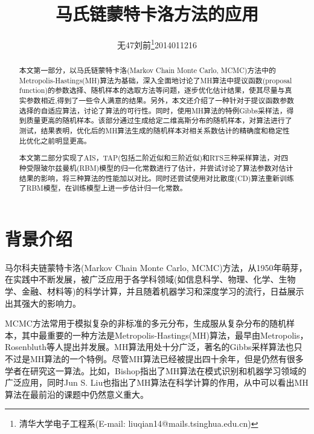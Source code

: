 \documentclass[11pt]{article}
\begin{document}
\title{马氏链蒙特卡洛方法的应用}
\author{无47\hspace{2em}刘前\thanks{清华大学电子工程系(E-mail: liuqian14@mails.tsinghua.edu.cn)}\hspace{2em}2014011216\hspace{2em}}

\maketitle


\begin{abstract}
  本文第一部分，以马氏链蒙特卡洛(Markov Chain Monte Carlo, MCMC)方法中的Metropolis-Hastings(MH)算法为基础，深入全面地讨论了MH算法中提议函数(proposal function)的参数选择、随机样本的选取方法等问题，逐步优化估计结果，使其尽量与真实参数相近,得到了一些令人满意的结果。另外，本文还介绍了一种针对于提议函数参数选择的自适应算法，讨论了算法的可行性。同时，使用MH算法的特例Gibbs采样法，得到质量更高的随机样本。该部分通过生成给定二维高斯分布的随机样本，对算法进行了测试，结果表明，优化后的MH算法生成的随机样本对相关系数估计的精确度和稳定性比优化之前明显更高。
  
  本文第二部分实现了AIS，TAP(包括二阶近似和三阶近似)和RTS三种采样算法，对四种受限玻尔兹曼机(RBM)模型的归一化常数进行了估计，并尝试讨论了算法参数对估计结果的影响，将三种算法的性能加以对比。同时还尝试使用对比散度(CD)算法重新训练了RBM模型，在训练模型上进一步估计归一化常数。
\end{abstract}


\newpage
\begin{center}
\tableofcontents
\end{center}
\newpage


\section{背景介绍}
马尔科夫链蒙特卡洛(Markov Chain Monte Carlo, MCMC)方法，从1950年萌芽，在实践中不断发展，被广泛应用于各学科领域(如信息科学、物理、化学、生物学、金融、材料等)的科学计算\cite{UMH}，并且随着机器学习和深度学习的流行，日益展示出其强大的影响力。

MCMC方法常用于模拟复杂的非标准的多元分布，生成服从复杂分布的随机样本，其中最重要的一种方法是Metropolis-Hastings(MH)算法，最早由Metropolis，Rosenbluth等人提出并发展\cite{MH1}。MH算法用处十分广泛，著名的Gibbs采样算法也只不过是MH算法的一个特例\cite{Gelman}。尽管MH算法已经被提出四十余年，但是仍然有很多学者在研究这一算法。比如，Bishop指出了MH算法在模式识别和机器学习领域的广泛应用\cite{PRML}，同时Jun S. Liu也指出了MH算法在科学计算的作用\cite{Jun}，从中可以看出MH算法在最前沿的课题中仍然意义重大。
\end{document}
